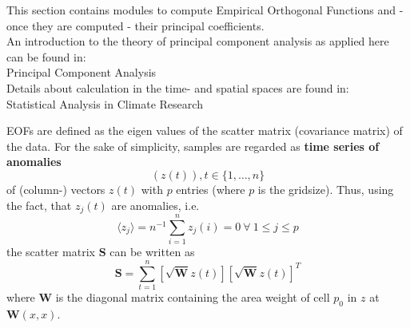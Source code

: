 This section contains modules to compute Empirical Orthogonal Functions and 
- once they are computed - their principal coefficients. \\
An introduction to the theory of principal component analysis as applied here can be found in:\\ 
\hspace*{1cm} Principal Component Analysis \cite{Peisendorfer} \\
Details about calculation in the time- and spatial spaces are found in:\\
\hspace*{1cm} Statistical Analysis in Climate Research \cite{vonStorch}

EOFs are defined as the eigen values of the scatter matrix (covariance matrix) of
the data. For the sake of simplicity, samples are regarded as \textbf{time series of anomalies}
\begin{displaymath}
\left(z(t)\right), t\in\{1,\ldots,n\}
\end{displaymath}
of (column-) vectors \(z(t)\) with \(p\) entries (where \(p\) is the gridsize). 
Thus, using the fact, that \(z_j(t)\) are anomalies, i.e.
\begin{displaymath}
\langle z_j\rangle=n^{-1}\sum_{i=1}^{n}z_j(i)=0~\forall~1\le j \le p
\end{displaymath} the scatter matrix \(\mathbf{S}\) can be written as
\begin{displaymath}
\mathbf{S} = \sum_{t=1}^{n} \left[\sqrt{\mathbf{W}}z(t)\right]\left[\sqrt{\mathbf{W}}z(t)\right]^T
\end{displaymath}
where \(\mathbf{W}\) is the diagonal matrix containing the area weight of cell \(p_0\) 
in \(z\) at \(\mathbf{W}(x,x)\).

